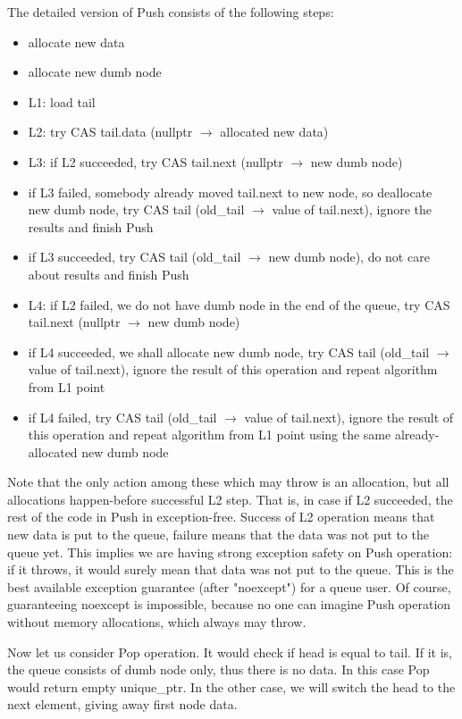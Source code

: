\documentclass{article}
\begin{document}
The detailed version of Push consists of the following steps:
\begin{itemize}
	\item allocate new data
	\item allocate new dumb node
	\item L1: load tail
	\item L2: try CAS tail.data (nullptr $\rightarrow$ allocated new data)
	\item L3: if L2 succeeded, try CAS tail.next (nullptr $\rightarrow$ new dumb node)
	\item if L3 failed, somebody already moved tail.next to new node, so deallocate new dumb node, try CAS tail (old\_tail $\rightarrow$ value of tail.next), ignore the results and finish Push
	\item if L3 succeeded, try CAS tail (old\_tail $\rightarrow$ new dumb node), do not care about results and finish Push
	\item L4: if L2 failed, we do not have dumb node in the end of the queue, try CAS tail.next (nullptr $\rightarrow$ new dumb node)
	\item if L4 succeeded, we shall allocate new dumb node, try CAS tail (old\_tail $\rightarrow$ value of tail.next), ignore the result of this operation and repeat algorithm from L1 point
	\item if L4 failed, try CAS tail (old\_tail $\rightarrow$ value of tail.next), ignore the result of this operation and repeat algorithm from L1 point using the same already-allocated new dumb node
\end{itemize}

Note that the only action among these which may throw is an allocation, but all allocations happen-before successful L2 step. That is, in case if L2 succeeded, the rest of the code in Push in exception-free. Success of L2 operation means that new data is put to the queue, failure means that the data was not put to the queue yet. This implies we are having strong exception safety on Push operation: if it throws, it would surely mean that data was not put to the queue. This is the best available exception guarantee (after "noexcept") for a queue user. Of course, guaranteeing noexcept is impossible, because no one can imagine Push operation without memory allocations, which always may throw.

Now let us consider Pop operation. It would check if head is equal to tail. If it is, the queue consists of dumb node only, thus there is no data. In this case Pop would return empty unique\_ptr. In the other case, we will switch the head to the next element, giving away first node data.
\end{document}
